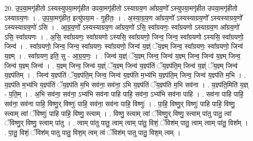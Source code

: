 \documentclass[17pt]{extarticle}
\begin{document}
20. उ॒प॒या॒मगृ॑हीतो ऽस्यस्युपया॒मगृ॑हीत उपया॒मगृ॑हीतो ऽस्याग्रय॒ण आ᳚ग्रय॒णो᳚ ऽस्युपया॒मगृ॑हीत उपया॒मगृ॑हीतो ऽस्याग्रय॒णः । . उ॒प॒या॒मगृ॑हीत॒ इत्यु॑पया॒म - गृ॒ही॒तः॒ । . अ॒स्या॒ग्र॒य॒ण आ᳚ग्रय॒णो᳚ ऽस्यस्याग्रय॒णो᳚ ऽस्यस्याग्रय॒णो᳚ ऽस्यस्याग्रय॒णो॑ ऽसि । . आ॒ग्र॒य॒णो᳚ ऽस्यस्याग्रय॒ण आ᳚ग्रय॒णो॑ ऽसि॒ स्वा᳚ग्रयणः॒ स्वा᳚ग्रयणो ऽस्याग्रय॒ण आ᳚ग्रय॒णो॑ ऽसि॒ स्वा᳚ग्रयणः । . अ॒सि॒ स्वा᳚ग्रयणः॒ स्वा᳚ग्रयणो ऽस्यसि॒ स्वा᳚ग्रयणो॒ जिन्व॒ जिन्व॒ स्वा᳚ग्रयणो ऽस्यसि॒ स्वा᳚ग्रयणो॒ जिन्व॑ । . स्वा᳚ग्रयणो॒ जिन्व॒ जिन्व॒ स्वा᳚ग्रयणः॒ स्वा᳚ग्रयणो॒ जिन्व॑ य॒ज्ञ्ं ॅय॒ज्ञ्म् जिन्व॒ स्वा᳚ग्रयणः॒ स्वा᳚ग्रयणो॒ जिन्व॑ य॒ज्ञ्म् । . स्वा᳚ग्रयण॒ इति॒ सु - आ॒ग्र॒य॒णः॒ । . जिन्व॑ य॒ज्ञ्ं ॅय॒ज्ञ्म् जिन्व॒ जिन्व॑ य॒ज्ञ्म् जिन्व॒ जिन्व॑ य॒ज्ञ्म् जिन्व॒ जिन्व॑ य॒ज्ञ्म् जिन्व॑ । . य॒ज्ञ्म् जिन्व॒ जिन्व॑ य॒ज्ञ्ं ॅय॒ज्ञ्म् जिन्व॑ य॒ज्ञ्प॑तिं ॅय॒ज्ञ्प॑ति॒म् जिन्व॑ य॒ज्ञ्ं ॅय॒ज्ञ्म् जिन्व॑ य॒ज्ञ्प॑तिम् । . जिन्व॑ य॒ज्ञ्प॑तिं ॅय॒ज्ञ्प॑ति॒म् जिन्व॒ जिन्व॑ य॒ज्ञ्प॑ति म॒भ्य॑भि य॒ज्ञ्प॑ति॒म् जिन्व॒ जिन्व॑ य॒ज्ञ्प॑ति म॒भि । . य॒ज्ञ्प॑ति म॒भ्य॑भि य॒ज्ञ्प॑तिं ॅय॒ज्ञ्प॑ति म॒भि सव॑ना॒ सव॑ना॒ ऽभि य॒ज्ञ्प॑तिं ॅय॒ज्ञ्प॑ति म॒भि सव॑ना । . य॒ज्ञ्प॑ति॒मिति॑ य॒ज्ञ् - प॒ति॒म् । . अ॒भि सव॑ना॒ सव॑ना॒ ऽभ्य॑भि सव॑ना पाहि पाहि॒ सव॑ना॒ ऽभ्य॑भि सव॑ना पाहि । . सव॑ना पाहि पाहि॒ सव॑ना॒ सव॑ना पाहि॒ विष्णु॒र् विष्णुः॑ पाहि॒ सव॑ना॒ सव॑ना पाहि॒ विष्णुः॑ । . पा॒हि॒ विष्णु॒र् विष्णुः॑ पाहि पाहि॒ विष्णु॒ स्त्वाम् त्वां ॅविष्णुः॑ पाहि पाहि॒ विष्णु॒ स्त्वाम् । . विष्णु॒ स्त्वाम् त्वां ॅविष्णु॒र् विष्णु॒ स्त्वाम् पा॑तु पातु॒ त्वां ॅविष्णु॒र् विष्णु॒ स्त्वाम् पा॑तु । . त्वाम् पा॑तु पातु॒ त्वाम् त्वाम् पा॑तु॒ विशं॒ ॅविश॑म् पातु॒ त्वाम् त्वाम् पा॑तु॒ विश᳚म् । . पा॒तु॒ विशं॒ ॅविश॑म् पातु पातु॒ विश॒म् त्वम् त्वं ॅविश॑म् पातु पातु॒ विश॒म् त्वम् । \newline
\end{document}
